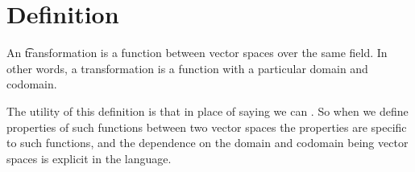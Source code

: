 

\section*{Definition}

An \t{transformation} is a function between vector spaces over the same field.
In other words, a transformation is a function with a particular domain and codomain.

The utility of this definition is that in place of saying  we can .
So when we define properties of such functions between two vector spaces the properties are specific to such functions, and the dependence on the domain and codomain being vector spaces is explicit in the language.

\blankpage
